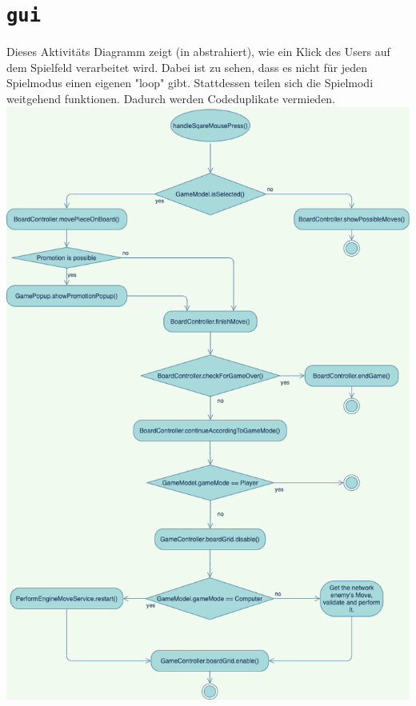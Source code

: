 \documentclass{scrreprt}
\newcommand{\lstinlinejava}[1]{\lstinline[language=java]{#1}}
\newcommand{\lstj}[1]{\lstinlinejava{#1}}
\begin{document}
\chapter{\lstj{gui}}
Dieses Aktivitäts Diagramm zeigt (in abstrahiert), wie ein Klick des Users auf dem Spielfeld verarbeitet wird.
Dabei ist zu sehen, dass es nicht für jeden Spielmodus einen eigenen "loop" gibt.
Stattdessen teilen sich die Spielmodi weitgehend funktionen. Dadurch werden Codeduplikate vermieden.
\includegraphics[width = \linewidth]{ActivityDiagramMove}
\end{document}
